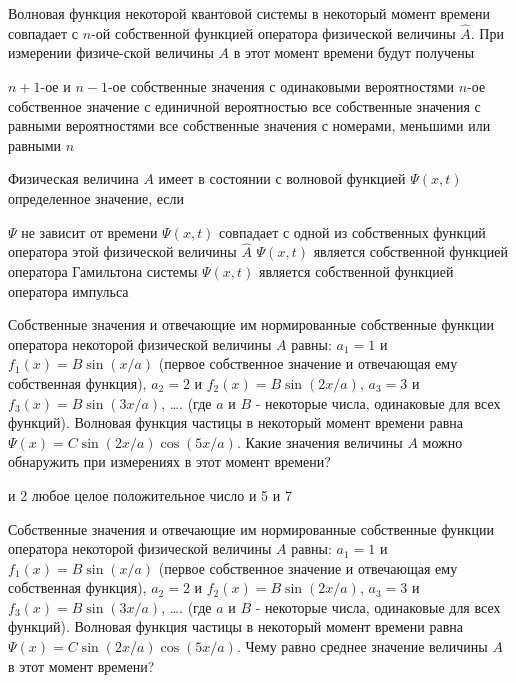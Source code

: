 \documentclass[11pt,a4paper]{exam}
\begin{document}
\begin{questions}
\question Волновая функция некоторой квантовой системы в некоторый момент времени совпадает с $n$-ой собственной функцией оператора физической величины $\hat A$. При измерении физиче-ской величины $A$ в этот момент времени будут получены
\begin{choices}
\choice $n + 1$-ое и $n - 1$-ое собственные значения с одинаковыми вероятностями
\choice $n$-ое собственное значение с единичной вероятностью
\choice все собственные значения с равными вероятностями
\choice все собственные значения с номерами, меньшими или равными $n$
\end{choices}

\question Физическая величина $A$ имеет в состоянии с волновой функцией $\Psi (x,t)$ определенное значение, если
\begin{choices}
\choice $\Psi $ не зависит от времени
\choice $\Psi (x,t)$ совпадает с одной из собственных функций оператора этой физической величины $\hat A$
\choice $\Psi (x,t)$ является собственной функцией оператора Гамильтона системы
\choice $\Psi (x,t)$ является собственной функцией оператора импульса
\end{choices}

\question Собственные значения и отвечающие им нормированные собственные функции оператора некоторой физической величины $A$ равны: ${a_1} = 1$ и ${f_1}(x) = B\sin (x/a)$ (первое собственное значение и отвечающая ему собственная функция), ${a_2} = 2$ и ${f_2}(x) = B\sin (2x/a)$, ${a_3} = 3$ и ${f_3}(x) = B\sin (3x/a)$, …. (где $a$ и $B$ - некоторые числа, одинаковые для всех функций). Волновая функция частицы в некоторый момент времени равна $\Psi (x) = C\sin (2x/a)\cos (5x/a)$. Какие значения величины $A$ можно обнаружить при измерениях в этот момент времени?
\begin{choices}
 и 2     
\choice любое целое положительное число      
 и 5     
 и 7
\end{choices}

\question Собственные значения и отвечающие им нормированные собственные функции оператора некоторой физической величины $A$ равны: ${a_1} = 1$ и ${f_1}(x) = B\sin (x/a)$ (первое собственное значение и отвечающая ему собственная функция), ${a_2} = 2$ и ${f_2}(x) = B\sin (2x/a)$, ${a_3} = 3$ и${f_3}(x) = B\sin (3x/a)$, …. (где $a$ и $B$ - некоторые числа, одинаковые для всех функций). Волновая функция частицы в некоторый момент времени равна $\Psi (x) = C\sin (2x/a)\cos (5x/a)$. Чему равно среднее значение величины $A$ в этот момент времени?
\begin{choices}
\end{choices}


\end{questions}
\end{document}
